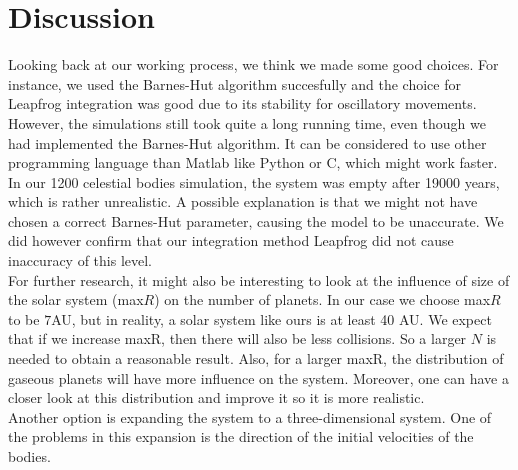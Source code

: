 \section{Discussion}
Looking back at our working process, we think we made some good choices.
For instance, we used the Barnes-Hut algorithm succesfully and the choice for Leapfrog integration was good due to its stability for oscillatory movements.\\

However, the simulations still took quite a long running time, even though we had implemented the Barnes-Hut algorithm. It can be considered to use other programming language than Matlab like Python or C, which might work faster.\\

In our 1200 celestial bodies simulation, the system was empty after 19000 years, which is rather unrealistic. A possible explanation is that we might not have chosen a correct Barnes-Hut parameter, causing the model to be unaccurate. We did however confirm that our integration method Leapfrog did not cause inaccuracy of this level.\\

For further research, it might also be interesting to look at the influence of size of the solar system (max\(R\)) on the number of planets. In our case we choose max\(R\) to be $7$AU, but in reality, a solar system like ours is at least 40 AU. We expect that if we increase maxR, then there will also be less collisions. So a larger $N$ is needed to obtain a reasonable result. Also, for a larger maxR, the distribution of gaseous planets will have more influence on the system. Moreover, one can have a closer look at this distribution and improve it so it is more realistic.\\

Another option is expanding the system to a three-dimensional system.
One of the problems in this expansion is the direction of the initial velocities of the bodies.




